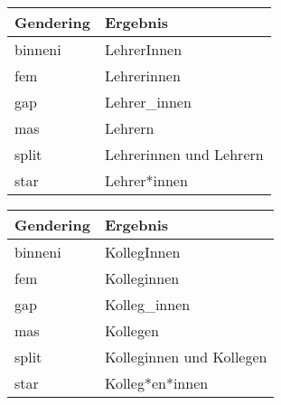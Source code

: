 \begin{multicols}{2}
\begin{commands}
	{\tiny \begin{tabular}{ll}
		\toprule \textbf{Gendering} & \textbf{Ergebnis} \\ 
		\midrule binneni & LehrerInnen \\ 
		fem & Lehrerinnen \\ 
		gap & Lehrer\_innen \\ 
		mas & Lehrern \\ 
		split & Lehrerinnen und Lehrern \\ 
		star & Lehrer*innen \\ 
		\bottomrule 
	\end{tabular} }
	
	{\tiny \begin{tabular}{ll}
		\toprule \textbf{Gendering} & \textbf{Ergebnis} \\ 
		\midrule binneni & KollegInnen \\ 
		fem & Kolleginnen \\ 
		gap & Kolleg\_innen \\ 
		mas & Kollegen \\ 
		split & Kolleginnen und Kollegen \\ 
		star & Kolleg*en*innen \\ 
		\bottomrule 
	\end{tabular} }
	
\end{commands}
\end{multicols}